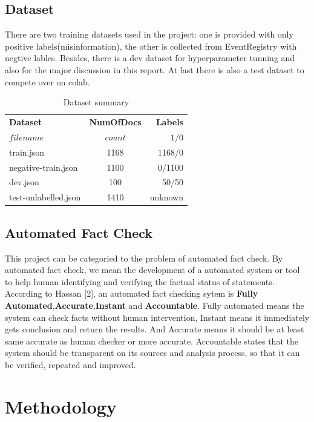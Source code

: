 \documentclass[11pt,a4paper]{article}
\begin{document}
\subsection{Dataset}
There are two training datasets used in the project: one is provided with only positive labels(misinformation), the other is collected from EventRegistry with negtive lables. Besides, there is a dev dataset for hyperparameter tunning and also for the major discussion in this report. At last there is also a test dataset to compete over on colab.
\begin{table}[h!]
  \begin{center}
    \caption{Dataset summary}
    \label{tab:table1}
    \begin{tabular}{l|c|r}
      \textbf{Dataset} & \textbf{NumOfDocs} & \textbf{Labels}\\
       $filename$ & $count$ & $1/0$ \\
      \hline
      train.json & 1168 & 1168/0\\
      negative-train.json & 1100 & 0/1100\\
      dev.json & 100 & 50/50\\
      test-unlabelled.json & 1410 & unknown\\
    \end{tabular}
  \end{center}
\end{table}

\subsection{Automated Fact Check}
This project can be categoried to the problem of automated fact check. By automated fact check, we mean the development of a automated system or tool to help human identifying and verifying the factual status of statements. According to Hassan [2], an automated fact checking sytem is \textbf{Fully Automated},\textbf{Accurate},\textbf{Instant} and \textbf{Accountable}. Fully automated means the system can check facts without human intervention, Instant means it immediately gets conclusion and return the results. And Accurate means it should be at least same accurate as human checker or more accurate. Accountable states that the system should be transparent on its sources and analysis process, so that it can be verified, repeated and improved.

\section{Methodology}
\end{document}
